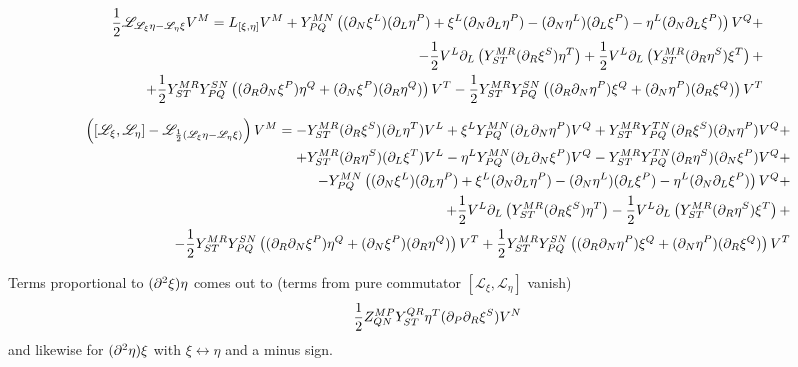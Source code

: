 \documentclass{article}
\begin{document}
\begin{align}
\frac{1}{2}\mathscr{L}_{\mathscr{L_\xi}\eta-\mathscr{L_\eta}\xi}V^M = L_{[\xi,\eta]}V^M+Y^{MN}_{PQ}\left((\partial_N\xi^L)(\partial_L\eta^P)+\xi^L(\partial_N\partial_L\eta^P)-(\partial_N\eta^L)(\partial_L\xi^P)-\eta^L(\partial_N\partial_L\xi^P)\right)V^Q+\\
-\frac{1}{2}V^L\partial_L\left(Y^{MR}_{ST}(\partial_R\xi^S)\eta^T\right)+\frac{1}{2}V^L\partial_L\left(Y^{MR}_{ST}(\partial_R\eta^S)\xi^T\right)+\\
+\frac{1}{2}Y^{MR}_{ST}Y^{SN}_{PQ}\left((\partial_R\partial_N\xi^P)\eta^Q+(\partial_N\xi^P)(\partial_R\eta^Q)\right)V^T-\frac{1}{2}Y^{MR}_{ST}Y^{SN}_{PQ}\left((\partial_R\partial_N\eta^P)\xi^Q+(\partial_N\eta^P)(\partial_R\xi^Q)\right)V^T
\end{align}

\begin{align}
    \left([\mathscr{L}_\xi,\mathscr{L}_\eta]-\mathscr{L}_{\frac{1}{2}\left(\mathscr{L}_\xi\eta-\mathscr{L}_\eta\xi\right)}\right)V^M = -Y^{MR}_{ST}(\partial_R\xi^S)(\partial_L\eta^T) V^L+\xi^LY^{MN}_{PQ}(\partial_L\partial_N\eta^P)V^Q+Y^{MR}_{ST}Y^{TN}_{PQ}(\partial_R\xi^S)(\partial_N\eta^P)V^Q+\\
    +Y^{MR}_{ST}(\partial_R\eta^S)(\partial_L\xi^T)V^L-\eta^LY^{MN}_{PQ}(\partial_L\partial_N\xi^P)V^Q-Y^{MR}_{ST}Y^{TN}_{PQ}(\partial_R\eta^S)(\partial_N\xi^P)V^Q+\\
    -Y^{MN}_{PQ}\left((\partial_N\xi^L)(\partial_L\eta^P)+\xi^L(\partial_N\partial_L\eta^P)-(\partial_N\eta^L)(\partial_L\xi^P)-\eta^L(\partial_N\partial_L\xi^P)\right)V^Q+\\
+\frac{1}{2}V^L\partial_L\left(Y^{MR}_{ST}(\partial_R\xi^S)\eta^T\right)-\frac{1}{2}V^L\partial_L\left(Y^{MR}_{ST}(\partial_R\eta^S)\xi^T\right)+\\
-\frac{1}{2}Y^{MR}_{ST}Y^{SN}_{PQ}\left((\partial_R\partial_N\xi^P)\eta^Q+(\partial_N\xi^P)(\partial_R\eta^Q)\right)V^T+\frac{1}{2}Y^{MR}_{ST}Y^{SN}_{PQ}\left((\partial_R\partial_N\eta^P)\xi^Q+(\partial_N\eta^P)(\partial_R\xi^Q)\right)V^T
\end{align}

Terms proportional to $(\partial^2\xi)\eta$ comes out to (terms from pure commutator $[\mathscr{L}_\xi,\mathscr{L}_\eta]$ vanish)
\begin{align}
    \frac{1}{2}Z_{QN}^{MP}Y^{QR}_{ST}\eta^T(\partial_P\partial_R\xi^S)V^N
\end{align}
and likewise for $(\partial^2\eta)\xi$ with $\xi\leftrightarrow\eta$ and a minus sign.
\end{document}
